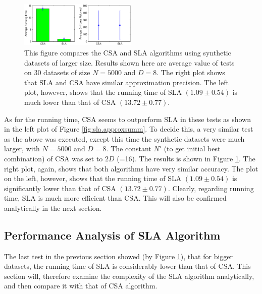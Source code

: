 \begin{figure}[here]
\includegraphics[width=0.50\textwidth]{images/fig56_approxsumm.eps}
\caption{ This figure compares the CSA and SLA algorithms using
  synthetic datasets of larger size. Results shown here are average
  value of tests on 30 datasets of size $N=5000$ and $D=8$. The right
  plot shows that SLA and CSA have similar approximation
  precision. The left plot, however, shows that the running time of
  SLA $(1.09 \pm 0.54)$ is much lower than that of CSA $(13.72 \pm
  0.77)$.  }
\label{fig:sla.approxsumm2}
\end{figure}

As for the running time, CSA seems to outperform SLA in these tests as
shown in the left plot of Figure \ref{fig:sla.approxsumm}. To decide
this, a very similar test as the above was executed, except this time
the synthetic datasets were much larger, with $N=5000$ and $D=8$. The
constant $N'$ (to get initial best combination) of CSA was set to $2D$
(=16). The results is shown in Figure \ref{fig:sla.approxsumm2}. The
right plot, again, shows that both algorithms have very similar
accuracy. The plot on the left, however, shows that the running time
of SLA $(1.09 \pm 0.54)$ is significantly lower than that of CSA
$(13.72 \pm 0.77)$. Clearly, regarding running time, SLA is much more
efficient than CSA. This will also be confirmed analytically in the
next section.


\subsection{Performance Analysis of SLA Algorithm}
\label{sec:sla.performance}

The last test in the previous section showed (by Figure
\ref{fig:sla.approxsumm2}), that for bigger datasets, the running time
of SLA is considerably lower than that of CSA. This section will,
therefore examine the complexity of the SLA algorithm analytically,
and then compare it with that of CSA algorithm.

